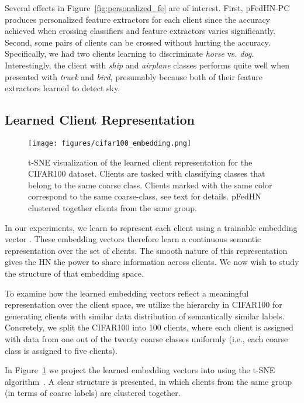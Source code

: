 \documentclass{article}
\newcommand\ourmethod{pFedHN}
\begin{document}
Several effects in Figure~\ref{fig:personalized_fe} are of interest. First, \ourmethod{}-PC produces personalized feature extractors for each client since the accuracy achieved when crossing classifiers and feature extractors varies significantly. Second, some pairs of clients can be crossed without hurting the accuracy. Specifically, we had two clients learning to discriminate \textit{horse} vs. \textit{dog}. Interestingly, the client with \textit{ship} and \textit{airplane} classes performs quite well when presented with \textit{truck} and \textit{bird}, presumably because both of their feature extractors learned to detect sky. 


\subsection{Learned Client Representation}

\begin{figure}[ht]
    \centering
    \texttt{[image: figures/cifar100\_embedding.png]}
    \caption{t-SNE visualization of the learned client representation  for the CIFAR100 dataset. Clients are tasked with classifying classes that belong to the same coarse class. Clients marked with the same color correspond to the same coarse-class, see text for details. \ourmethod{} clustered together clients from the same group.}
    \label{fig:embedding}
\end{figure}
In our experiments, we learn to represent each client using a trainable embedding vector . These embedding vectors therefore learn a continuous semantic representation over the set of clients. The smooth nature of this representation gives the HN the power to share information across clients. 
We now wish to study the structure of that embedding space.  

To examine how the learned embedding vectors reflect a meaningful representation over the client space, 
we utilize the hierarchy in CIFAR100 for generating clients with similar data distribution of semantically similar labels. Concretely, we split the CIFAR100 into 100 clients, where each client is assigned with data from one out of the twenty coarse classes uniformly (i.e., each coarse class is assigned to five clients). 

In Figure~\ref{fig:embedding} we project the learned embedding vectors into  using the t-SNE algorithm~\cite{Maaten2008VisualizingDU}. A clear structure is presented, in which clients from the same group (in terms of coarse labels) are clustered together. 
\end{document}
